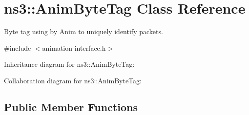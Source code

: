 \hypertarget{classns3_1_1AnimByteTag}{}\section{ns3\+:\+:Anim\+Byte\+Tag Class Reference}
\label{classns3_1_1AnimByteTag}


Byte tag using by Anim to uniquely identify packets.  




{\ttfamily \#include $<$animation-\/interface.\+h$>$}



Inheritance diagram for ns3\+:\+:Anim\+Byte\+Tag\+:


Collaboration diagram for ns3\+:\+:Anim\+Byte\+Tag\+:
\subsection*{Public Member Functions}
